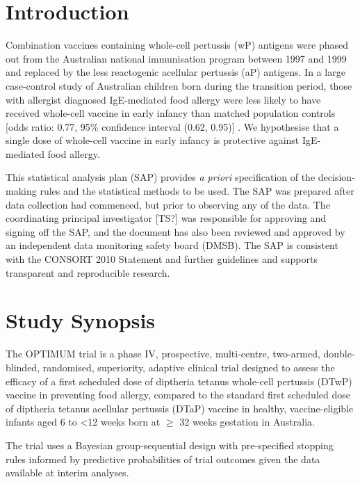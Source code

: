 \documentclass{bmcart}
\begin{document}

\section*{Introduction}

Combination vaccines containing whole-cell pertussis (wP) antigens were phased out from the Australian national immunisation program between 1997 and 1999 and replaced by the less reactogenic acellular pertussis (aP) antigens.
In a large case-control study of Australian children born during the transition period, those with allergist diagnosed IgE-mediated food allergy were less likely to have received whole-cell vaccine in early infancy than matched population controls [odds ratio: 0.77, 95\% confidence interval (0.62, 0.95)] \cite{estcourt2020whole}.
We hypothesise that a single dose of whole-cell vaccine in early infancy is protective against IgE-mediated food allergy.

This statistical analysis plan (SAP) provides \textit{a priori} specification of the decision-making rules and the statistical methods to be used. 
The SAP was prepared after data collection had commenced, but prior to observing any of the data. 
The coordinating principal investigator [TS?] was responsible for approving and signing off the SAP, and the document has also been reviewed and approved by an independent data monitoring safety board (DMSB). 
The SAP is consistent with the CONSORT 2010 Statement and further guidelines and supports transparent and reproducible research.

\section*{Study Synopsis}

The OPTIMUM trial is a phase IV, prospective, multi-centre, two-armed, double-blinded, randomised, superiority, adaptive clinical trial designed to assess the efficacy of a first scheduled dose of diptheria tetanus whole-cell pertussis (DTwP) vaccine in preventing food allergy, compared to the standard first scheduled dose of diptheria tetanus acellular pertussis (DTaP) vaccine in healthy, vaccine-eligible infants aged 6 to \textless12 weeks born at \(\geq\) 32 weeks gestation in Australia.

The trial uses a Bayesian group-sequential design with pre-specified stopping rules informed by predictive probabilities of trial outcomes given the data available at interim analyses.
\end{document}
